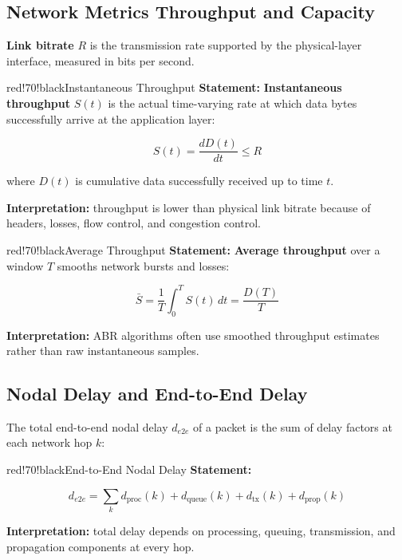 \subsection{Network Metrics Throughput and Capacity}

\textbf{Link bitrate} $R$ is the transmission rate supported by the physical-layer interface, measured in bits per second.

\begin{calloutbox}{red!70!black}{Instantaneous Throughput}
\textbf{Statement:} \textbf{Instantaneous throughput} $S(t)$ is the actual time-varying rate at which data bytes successfully arrive at the application layer:

\[
S(t) = \frac{dD(t)}{dt} \leq R
\]

where $D(t)$ is cumulative data successfully received up to time $t$.

\textbf{Interpretation:} throughput is lower than physical link bitrate because of headers, losses, flow control, and congestion control.
\end{calloutbox}

\begin{calloutbox}{red!70!black}{Average Throughput}
\textbf{Statement:} \textbf{Average throughput} over a window $T$ smooths network bursts and losses:

\[
\bar{S} = \frac{1}{T} \int_0^T S(t)\,dt = \frac{D(T)}{T}
\]

\textbf{Interpretation:} ABR algorithms often use smoothed throughput estimates rather than raw instantaneous samples.
\end{calloutbox}

\subsection{Nodal Delay and End-to-End Delay}

The total end-to-end nodal delay $d_{e2e}$ of a packet is the sum of delay factors at each network hop $k$:

\begin{calloutbox}{red!70!black}{End-to-End Nodal Delay}
\textbf{Statement:}

\[
d_{e2e} = \sum_k d_{\text{proc}}(k) + d_{\text{queue}}(k) + d_{\text{tx}}(k) + d_{\text{prop}}(k)
\]

\textbf{Interpretation:} total delay depends on processing, queuing, transmission, and propagation components at every hop.
\end{calloutbox}

